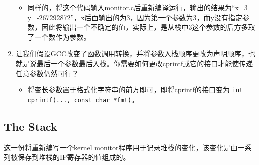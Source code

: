 \begin{enumerate}
\begin{itemize}
            \item 同样的，将这个代码输入monitor.c后重新编译运行，输出的结果为``x=3 y=-267292872''，x后面输出的为3，因为第一个参数为3，而y没有指定参数，因此将输出一个不确定的值，实际上，是从栈中3这个参数的后方多取了一个数作为参数。
        \end{itemize}
    \item 让我们假设GCC改变了函数调用转换，并将参数入栈顺序更改为声明顺序，也就是说最后一个参数最后入栈。你需要如何更改cprintf或它的接口才能使传递任意参数仍然可行？
        \begin{itemize}
            \item 将变长参数置于格式化字符串的前方即可，即将cprintf的接口变为 \lstinline{int cprintf(..., const char *fmt)}。
        \end{itemize}
\end{enumerate}

\subsection{The Stack}
\par 这一份将重新编写一个kernel monitor程序用于记录堆栈的变化，该变化是由一系列被保存到堆栈的IP寄存器的值组成的。

